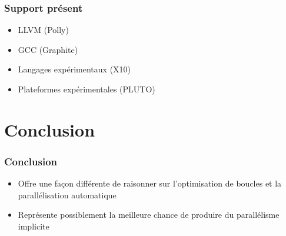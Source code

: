 \documentclass{beamer}
\begin{document}
\begin{frame}
\frametitle{Support présent}
\begin{itemize}
\item LLVM (Polly)
\item GCC (Graphite)
\item Langages expérimentaux (X10)
\item Plateformes expérimentales (PLUTO)
\end{itemize}
\end{frame}

\section{Conclusion}
\begin{frame}
\frametitle{Conclusion}
\begin{itemize}
\item Offre une façon différente de raisonner sur l'optimisation de boucles et la parallélisation automatique
\item Représente possiblement la meilleure chance de produire du parallélisme implicite
\end{itemize}
\end{frame}
\end{document}
